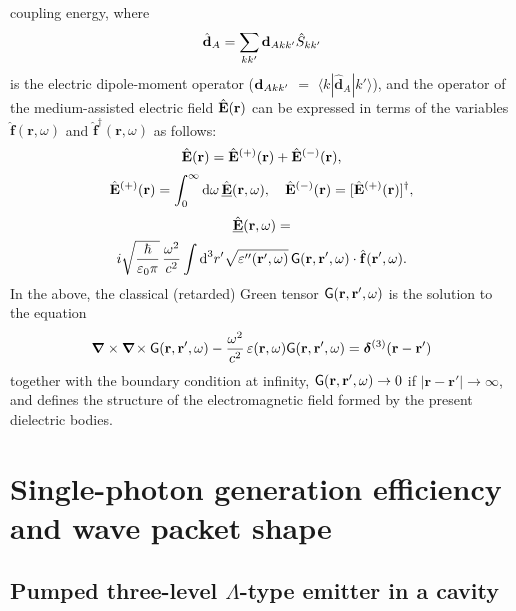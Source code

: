 \documentclass[pra, twocolumn]{revtex4}
\newcommand{\D}{\mbox{\rm d}}
\newcommand{\uhb}[1]{\underline{\hat{\mathbf{#1}}}}
\newcommand{\hb}[1]{\hat{\mathbf{#1}}}
\begin{document}
coupling energy, where
\begin{equation}
   \label{1.7}
    \hb{ d}_A = \sum _{kk'}
    {\bf d} _{Akk'}  \hat{S} _{kk'}
\end{equation}
is the electric dipole-moment operator
($ {\bf d} _{Akk'}$ $\!=$ $\!\langle k|
\hb{ d}_{\!A} | k' \rangle$),
and the operator of the
medium-assisted electric field $\hb{E}({\bf r})$
can be expressed in terms of the variables
$\hat{\mathbf{f}}(\mathbf{r},\omega)$ and
$\hat{\mathbf{f}}^\dagger(\mathbf{r},\omega)$ as
follows:
\begin{equation}
\label{1.9}
\hb{E}({\bf r}) = \hb{E}^{(+)}({\bf r})
        +\hb{E}^{(-)}({\bf r}),
\end{equation}
\begin{equation}
\label{1.10}
\hb{E}^{(+)}({\bf r}) = \int_0^\infty \D\omega\,
      \uhb{E}({\bf r},\omega),
\quad
\hb{E}^{(-)}({\bf r}) =
[\hb{E}^{(+)}({\bf r})]^\dagger,
\end{equation}
\begin{multline}
      \label{1.11}
      \uhb{ E}({\bf r},\omega) =
\\
i \sqrt{\frac {\hbar}{\varepsilon_0\pi}}\,
\frac{ \omega^2}{c^2}
      \int \D^3r'\sqrt{\varepsilon''({\bf r}',\omega)}\,
      \mathsf{G}({\bf r},{\bf r}',\omega)
      \cdot\hb{f}({\bf r}',\omega).
\end{multline}
In the above, the classical (retarded)
Green tensor $\mathsf{G}({\bf r},{\bf r}',\omega)$
is the solution to the equation
\begin{equation}
      \label{1.13}
      \bm{\nabla}
\times
    \bm{\nabla}\!  \times \mathsf{G}  ({\bf r }, {\bf r }', \omega)
      - \frac {\omega ^2 } {c^2} \,\varepsilon ( {\bf r } ,\omega)
      \mathsf{G}  ({\bf r}, {\bf r }', \omega)
      =  \bm{\delta} ^{(3)}  ({\bf r }-{\bf r }')
      \end{equation}
together with the boundary condition at infinity,
$\mathsf{G}({\bf r},{\bf r}',\omega)\to 0$ if
$|\mathbf{r}-\mathbf{r}'|\to\infty$, and defines the structure of the
electromagnetic field
formed by
the present dielectric bodies.

\section{
Single-photon generation efficiency and wave packet shape}
\label{sec3}
\subsection{
Pumped three-level
$\Lambda$-type emitter in a cavity}
\label{sec3.3}
\end{document}
